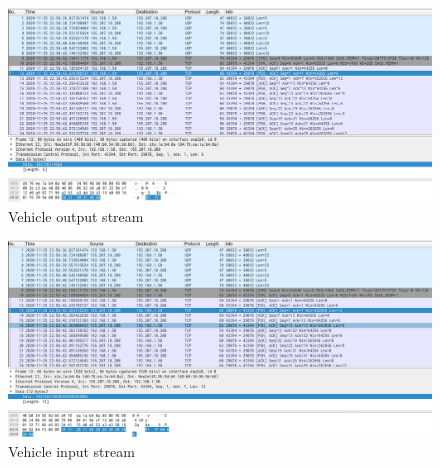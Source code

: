 \documentclass[12pt, a4paper]{article}
\begin{document}
\begin{figure}[h!]
\centering
	\includegraphics[height=.4\textheight, width=\textwidth, keepaspectratio]{assets/wireshark/vehicle3.png}
	\caption{Vehicle output stream} 
\end{figure}

\pagebreak

\begin{figure}[h!]
\centering
	\includegraphics[height=.4\textheight, width=\textwidth, keepaspectratio]{assets/wireshark/vehicle4.png}
	\caption{Vehicle input stream} 
\end{figure}
\end{document}
